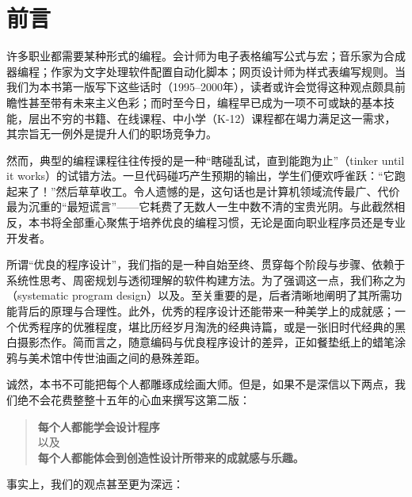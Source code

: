 
\chapter*{前言}
\label{sec:preface}
\renewcommand{\thefigure}{\arabic{figure}}\setcounter{figure}{0}
\renewcommand{\thetable}{\arabic{table}}\setcounter{table}{0}

许多职业都需要某种形式的编程。会计师为电子表格编写公式与宏；音乐家为合成器编程；作家为文字处理软件配置自动化脚本；网页设计师为样式表编写规则。当我们为本书第一版写下这些话时（1995--2000年），读者或许会觉得这种观点颇具前瞻性甚至带有未来主义色彩；而时至今日，编程早已成为一项不可或缺的基本技能，层出不穷的书籍、在线课程、中小学（K-12）课程都在竭力满足这一需求，其宗旨无一例外是提升人们的职场竞争力。

然而，典型的编程课程往往传授的是一种“瞎碰乱试，直到能跑为止”（tinker until it works）的试错方法。一旦代码碰巧产生预期的输出，学生们便欢呼雀跃：“它跑起来了！”然后草草收工。令人遗憾的是，这句话也是计算机领域流传最广、代价最为沉重的“最短谎言”——它耗费了无数人一生中数不清的宝贵光阴。与此截然相反，本书将全部重心聚焦于培养优良的编程习惯，无论是面向职业程序员还是专业开发者。

所谓“优良的程序设计”，我们指的是一种自始至终、贯穿每个阶段与步骤、依赖于系统性思考、周密规划与透彻理解的软件构建方法。为了强调这一点，我们称之为（systematic program design）以及。至关重要的是，后者清晰地阐明了其所需功能背后的原理与合理性。此外，优秀的程序设计还能带来一种美学上的成就感；一个优秀程序的优雅程度，堪比历经岁月淘洗的经典诗篇，或是一张旧时代经典的黑白摄影杰作。简而言之，随意编码与优良程序设计的差异，正如餐垫纸上的蜡笔涂鸦与美术馆中传世油画之间的悬殊差距。

诚然，本书不可能把每个人都雕琢成绘画大师。但是，如果不是深信以下两点，我们绝不会花费整整十五年的心血来撰写这第二版：

\begin{quote}
\centering
\large\textbf{每个人都能学会设计程序} \\[1ex]
以及 \\[1ex]
\large\textbf{每个人都能体会到创造性设计所带来的成就感与乐趣。}
\end{quote}

事实上，我们的观点甚至更为深远：

